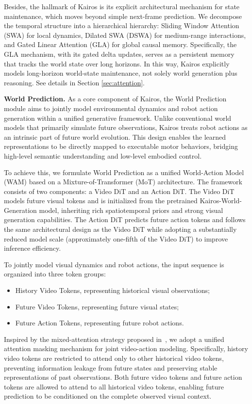 \documentclass{llmxive}
\begin{document}
Besides, the hallmark of Kairos is its explicit architectural mechanism for state maintenance, which moves beyond simple next-frame prediction. We decompose the temporal structure into a hierarchical hierarchy: Sliding Window Attention (SWA) for local dynamics, Dilated SWA (DSWA) for medium-range interactions, and Gated Linear Attention (GLA) for global causal memory. Specifically, the GLA mechanism, with its gated delta updates, serves as a persistent memory that tracks the world state over long horizons. In this way, Kairos explicitly models long-horizon world-state maintenance, not solely world generation plus reasoning. See details in Section \ref{sec:attention}.


\textbf{World Prediction.}
As a core component of Kairos, the World Prediction module aims to jointly model environmental dynamics and robot action generation within a unified generative framework. Unlike conventional world models that primarily simulate future observations, Kairos treats robot actions as an intrinsic part of future world evolution. This design enables the learned representations to be directly mapped to executable motor behaviors, bridging high-level semantic understanding and low-level embodied control.

To achieve this, we formulate World Prediction as a unified World-Action Model (WAM) based on a Mixture-of-Transformer (MoT) architecture. The framework consists of two components: a Video DiT and an Action DiT. The Video DiT models future visual tokens and is initialized from the pretrained Kairos-World-Generation model, inheriting rich spatiotemporal priors and strong visual generation capabilities. The Action DiT predicts future action tokens and follows the same architectural design as the Video DiT while adopting a substantially reduced model scale (approximately one-fifth of the Video DiT) to improve inference efficiency.

To jointly model visual dynamics and robot actions, the input sequence is organized into three token groups:
\begin{itemize}
\item History Video Tokens, representing historical visual observations;
\item Future Video Tokens, representing future visual states;
\item Future Action Tokens, representing future robot actions.
\end{itemize}

Inspired by the mixed-attention strategy proposed in~\cite{yuan2026fastwam}, we adopt a unified attention masking mechanism for joint video-action modeling. Specifically, history video tokens are restricted to attend only to other historical video tokens, preventing information leakage from future states and preserving stable representations of past observations. Both future video tokens and future action tokens are allowed to attend to all historical video tokens, enabling future prediction to be conditioned on the complete observed visual context.
\end{document}
